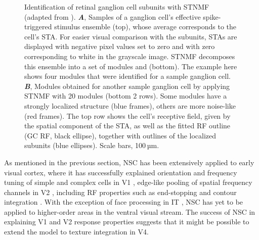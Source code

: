 \begin{figure}[h]
	\centering
    \caption{
    Identification of retinal ganglion cell subunits 
    with \ac{STNMF} (adapted  from \cite{Liu2017}).
    \textbf{\emph{A}},
	     Samples of a ganglion cell’s effective spike-triggered stimulus ensemble (top),
         whose average corresponds to the cell’s \ac{STA}.
         For easier visual comparison with the subunits,
         \acp{STA} are displayed with negative pixel values set to zero and
         with zero corresponding to white in the grayscale image.
         \ac{STNMF} decomposes this ensemble into a set of modules and 
          (bottom).
         The example here shows four modules that were identified for
         a sample ganglion cell.
    \textbf{\emph{B}},
         Modules obtained for another sample ganglion cell by applying \ac{STNMF}
         with 20 modules (bottom 2 rows). Some modules have a strongly localized structure 
         (blue frames), others are more noise-like (red frames).
         The top row shows the cell’s receptive field,
         given by the spatial component of the \ac{STA}, as well as the fitted \ac{RF} outline
         (GC RF, black ellipse), together with outlines of the localized subunits 
         (blue ellipses). Scale bars, 100 µm.
    }
	\label{fig:NMF|retina}
\end{figure}

As mentioned in the previous section,
\ac{NSC} has been extensively applied to early visual cortex,
where it has successfully explained 
orientation and frequency tuning of simple and complex cells in \ac{V1} \cite{Hoyer2003},
edge-like pooling of spatial frequency channels in V2 \cite{Hyvarinen2005},
including \ac{RF} properties such as end-stopping and contour integration 
\cite{HoyerHyvarinen2002}.
With the exception of face processing in \ac{IT}
\cite{LeeSeung1999,ChangTsao2017},
\ac{NSC} has yet to be applied to higher-order areas in the ventral visual stream.
The success of \ac{NSC} in explaining V1 and V2 response properties
suggests that it might be possible to extend the model to texture integration in
V4.

